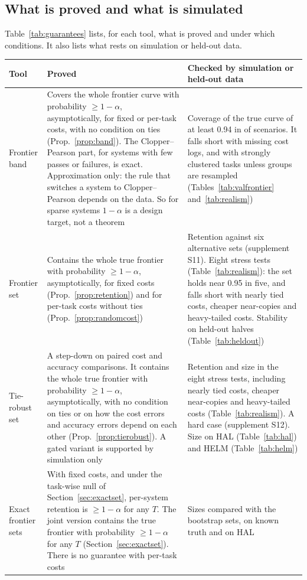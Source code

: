 \documentclass[11pt]{article}
\begin{document}
\subsection{What is proved and what is simulated}
Table~\ref{tab:guarantees} lists, for each tool, what is proved and under which conditions. It also lists what rests on simulation or held-out data.
\begin{table}[!tbp]
\centering\footnotesize
\begin{tabular}{p{3.2cm}p{5.3cm}p{6.1cm}}
\toprule
Tool & Proved & Checked by simulation or held-out data \\
\midrule
Frontier band & Covers the whole frontier curve with probability $\ge1-\alpha$, asymptotically, for fixed or per-task costs, with no condition on ties (Prop.~\ref{prop:band}). The Clopper--Pearson part, for systems with few passes or failures, is exact. Approximation only: the rule that switches a system to Clopper--Pearson depends on the data. So for sparse systems $1-\alpha$ is a design target, not a theorem & Coverage of the true curve of at least 0.94 in \NumValBandOk{} of \NumValScenarios{} scenarios. It falls short with missing cost logs, and with strongly clustered tasks unless groups are resampled (Tables~\ref{tab:valfrontier} and~\ref{tab:realism}) \\
Frontier set & Contains the whole true frontier with probability $\ge1-\alpha$, asymptotically, for fixed costs (Prop.~\ref{prop:retention}) and for per-task costs without ties (Prop.~\ref{prop:randomcost}) & Retention against six alternative sets (supplement S11). Eight stress tests (Table~\ref{tab:realism}): the set holds near 0.95 in five, and falls short with nearly tied costs, cheaper near-copies and heavy-tailed costs. Stability on held-out halves (Table~\ref{tab:heldout}) \\
Tie-robust set & A step-down on paired cost and accuracy comparisons. It contains the whole true frontier with probability $\ge1-\alpha$, asymptotically, with no condition on ties or on how the cost errors and accuracy errors depend on each other (Prop.~\ref{prop:tierobust}). A gated variant is supported by simulation only & Retention and size in the eight stress tests, including nearly tied costs, cheaper near-copies and heavy-tailed costs (Table~\ref{tab:realism}). A hard case (supplement S12). Size on HAL (Table~\ref{tab:hal}) and HELM (Table~\ref{tab:helm}) \\
Exact frontier sets & With fixed costs, and under the task-wise null of Section~\ref{sec:exactset}, per-system retention is $\ge1-\alpha$ for any $T$. The joint version contains the true frontier with probability $\ge1-\alpha$ for any $T$ (Section~\ref{sec:exactset}). There is no guarantee with per-task costs & Sizes compared with the bootstrap sets, on known truth and on HAL \\

\end{tabular}
\end{table}
\end{document}

